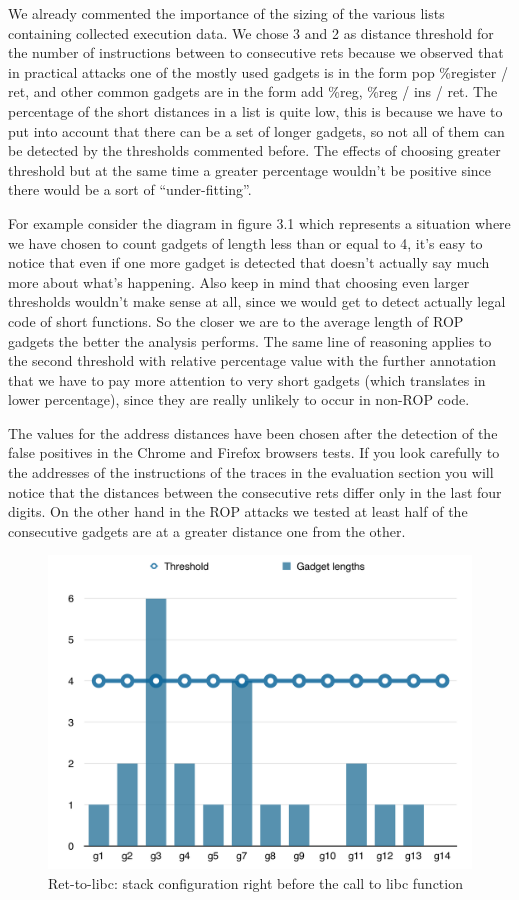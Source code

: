 \documentclass[Lau,binding=0.6cm]{sapthesis}
\begin{document}
We already commented the importance of the sizing of the various lists containing collected execution data. We chose 3 and 2 as distance threshold for the number of instructions between to consecutive rets because we observed that in practical attacks one of the mostly used gadgets is in the form pop \%register / ret, and other common gadgets are in the form add \%reg, \%reg / ins / ret. The percentage of the short distances in a list is quite low, this is because we have to put into account that there can be a set of longer gadgets, so not all of them can be detected by the thresholds commented before. The effects of choosing greater threshold but at the same time a greater percentage wouldn’t be positive since there would be a sort of “under-fitting”. 


For example consider the diagram in figure 3.1 which represents a situation where we have chosen to count gadgets of length less than or equal to 4, it’s easy to notice that even if one more gadget is detected that doesn’t actually say much more about what’s happening. Also keep in mind that choosing even larger thresholds wouldn’t make sense at all, since we would get to detect actually legal code of short functions. So the closer we are to the average length of ROP gadgets the better the analysis performs. The same line of reasoning applies to the second threshold with relative percentage value with the further annotation that we have to pay more attention to very short gadgets (which translates in lower percentage), since they are really unlikely to occur in non-ROP code.  


The values for the address distances have been chosen after the detection of the false positives in the Chrome and Firefox browsers tests. If you look carefully to the addresses of the instructions of the traces in the evaluation section you will notice that the distances between the consecutive rets differ only in the last four digits. On the other hand in the ROP attacks we tested at least half of the consecutive gadgets are at a greater distance one from the other.

\begin{figure}
\centering
\includegraphics[width=1\textwidth]{params}
\caption{Ret-to-libc: stack configuration right before the call to libc function}
\label{fig:largenenough}
\end{figure}
\end{document}
